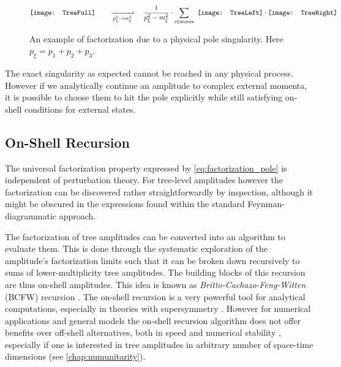 \begin{figure}[ht]
  \setlength{\figureheight}{0.11\textheight}
  \centering
  \begin{equation*}
    \vcenter{\hbox{\texttt{[image: TreeFull]}}} 
    \qquad \xrightarrow[p^2_\xi \to m_\xi^2]{} \quad
    \frac{1}{p^2_\xi - m_\xi^2} \cdot
    \sum_{i\in \text{states}}^{} ~
    \vcenter{\hbox{\texttt{[image: TreeLeft]}}}\cdot
    \vcenter{\hbox{\texttt{[image: TreeRight]}}}
  \end{equation*}
  \caption{
    An example of factorization due to a physical pole singularity. 
    Here $p_\xi =  p_1 + p_2 + p_3$.
  }
  \label{fig:factorization}
\end{figure}



The exact singularity as expected cannot be reached in any physical process.
However if we analytically continue an amplitude to complex external momenta,
it is possible to choose them to hit the pole explicitly
while still satisfying on-shell conditions for external states.


\subsection{On-Shell Recursion}
\label{sec:BCFW}

The universal factorization  property expressed by \cref{eq:factorization_pole} is independent of perturbation theory. 
For tree-level amplitudes however the factorization can be discovered rather straightforwardly by inspection,
although it might be obscured in the expressions found within the standard Feynman-diagrammatic approach.

The factorization of tree amplitudes can be converted into an algorithm to evaluate them.
This is done through the systematic exploration of the amplitude's factorization limits such that
it can be broken down recursively to sums of lower-multiplicity tree amplitudes. 
The building blocks of this recursion are thus on-shell amplitudes.
This idea is known as \emph{Britto-Cachazo-Feng-Witten} (BCFW) recursion \cite{Britto2005c,Britto2005f}.
The on-shell recursion is a very powerful tool for analytical computations, especially 
in theories with supersymmetry \cite{Dixon:2010ik,Drummond:2008cr,Bourjaily:2010wh}.
However for numerical applications and general models the on-shell recursion algorithm
does not offer benefits over off-shell alternatives, both in speed and numerical stability \cite{Duhr:2006iq,Drummond:2008cr,Badger:2012uz},
especially if one is interested in tree amplitudes in arbitrary number of space-time dimensions (see \cref{chap:numunitarity}). 



